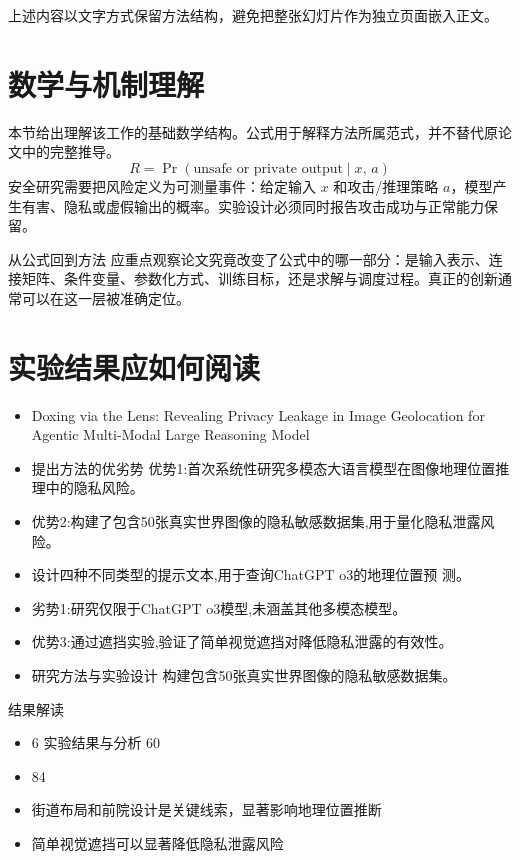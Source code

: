 \documentclass[UTF8,11pt,a4paper]{ctexart}
\begin{document}
上述内容以文字方式保留方法结构，避免把整张幻灯片作为独立页面嵌入正文。

\section{数学与机制理解}
本节给出理解该工作的基础数学结构。公式用于解释方法所属范式，并不替代原论文中的完整推导。
\begin{equation}
R=\Pr(\text{unsafe or private output}\mid x,\,a)
\end{equation}
安全研究需要把风险定义为可测量事件：给定输入 $x$ 和攻击/推理策略 $a$，模型产生有害、隐私或虚假输出的概率。实验设计必须同时报告攻击成功与正常能力保留。

\begin{keybox}{从公式回到方法}
应重点观察论文究竟改变了公式中的哪一部分：是输入表示、连接矩阵、条件变量、参数化方式、训练目标，还是求解与调度过程。真正的创新通常可以在这一层被准确定位。
\end{keybox}


\section{实验结果应如何阅读}
\begin{itemize}
\item Doxing via the Lens: Revealing Privacy Leakage in Image Geolocation for Agentic Multi-Modal Large Reasoning Model
\item 提出方法的优劣势 优势1:首次系统性研究多模态大语言模型在图像地理位置推理中的隐私风险。
\item 优势2:构建了包含50张真实世界图像的隐私敏感数据集,用于量化隐私泄露风险。
\item 设计四种不同类型的提示文本,用于查询ChatGPT o3的地理位置预 测。
\item 劣势1:研究仅限于ChatGPT o3模型,未涵盖其他多模态模型。
\item 优势3:通过遮挡实验,验证了简单视觉遮挡对降低隐私泄露的有效性。
\item 研究方法与实验设计 构建包含50张真实世界图像的隐私敏感数据集。
\end{itemize}

\begin{notebox}{结果解读}
\begin{itemize}
\item 6 实验结果与分析 60\\%
\item 84\\%
\item 街道布局和前院设计是关键线索，显著影响地理位置推断
\item 简单视觉遮挡可以显著降低隐私泄露风险
\end{itemize}
\end{notebox}
\end{document}
